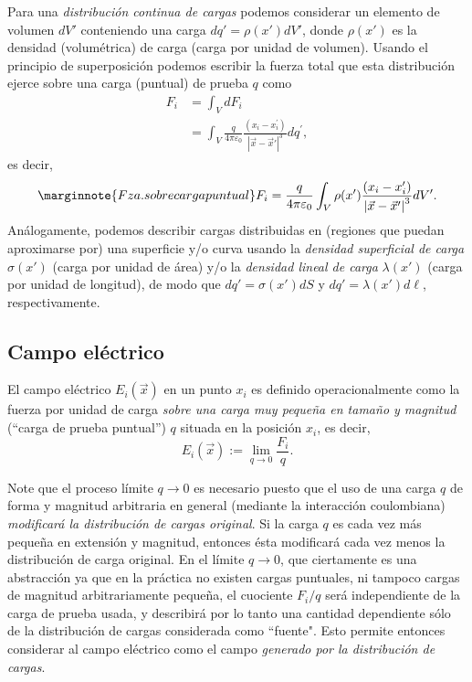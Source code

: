 Para una \textit{distribución continua de cargas} podemos considerar un elemento de
volumen $dV'$ conteniendo una carga $dq'=\rho(x')dV'$, donde $\rho(x')$ es
la densidad (volumétrica) de carga (carga por unidad de volumen). Usando el
principio de superposición podemos escribir la fuerza total que esta
distribución ejerce sobre una carga (puntual) de prueba $q$ como
\begin{align}
F_i  &= \int_V dF_i \\
& =\int_V\frac{q}{4\pi\varepsilon_0}\frac{\left(  x_i-x_i^{\prime
}\right)  }{\left\vert \vec x-\vec x'\right\vert ^3}dq^{\prime},
\end{align}
es decir,
\begin{equation}\marginnote{Fza. sobre carga puntual}
F_i  =\frac{q}{4\pi\varepsilon_0}\int_V\rho(x')\frac{\left(x_i-x_i'\right)
}{\left\vert \vec x-\vec x'\right\vert
^3}dV' .\label{leycoulomb-conti}
\end{equation}
Análogamente, podemos describir cargas distribuidas en (regiones que puedan
aproximarse por) una superficie y/o curva usando la \textit{densidad superficial de
carga} $\sigma(x')$ (carga por unidad de área) y/o la \textit{densidad lineal de carga} $\lambda(x')$ (carga por unidad de longitud), de modo que $dq'=\sigma(x')dS$
y $dq'=\lambda(x')d\ell$, respectivamente.

\subsection{Campo eléctrico}
El campo eléctrico $E_i(\vec{x})$ en un punto $x_i$ es definido operacionalmente como la fuerza por unidad de carga \textit{sobre una carga muy peque\~na en tama\~no y magnitud} (``carga de prueba puntual'') $q$ situada en la posición $x_i$, es decir,
\begin{equation}
E_i(\vec x):=\lim_{q\rightarrow0}\frac{F_i}{q}.
\end{equation}

Note que el proceso límite ${q\rightarrow0}$ es necesario puesto que el uso de una carga $q$ de forma y magnitud arbitraria en general (mediante la interacción coulombiana) \textit{modificará la distribución de cargas original}. Si la carga $q$ es cada vez más peque\~na en extensión y magnitud, entonces ésta modificará cada vez menos la distribución de carga original. En el límite ${q\rightarrow0}$, que ciertamente es una abstracción ya que en la práctica no existen cargas puntuales, ni tampoco cargas de magnitud arbitrariamente peque\~na, el cuociente $F_i/q$ será independiente de la carga de prueba usada, y describirá por lo tanto una cantidad dependiente sólo de la distribución de cargas considerada como ``fuente". Esto permite entonces considerar al campo eléctrico como el campo \textit{generado por la distribución de cargas}.


